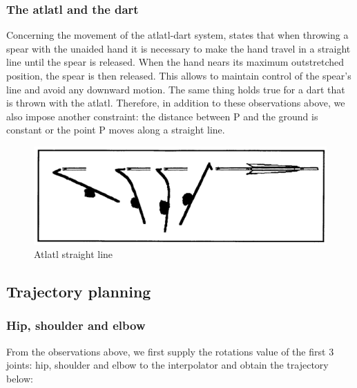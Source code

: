 \documentclass[a4paper, xcolor = usenames,dvipsnames]{article}
\begin{document}
\hypertarget{the-atlatl-and-the-dart}{%
\subsubsection{The atlatl and the dart}\label{the-atlatl-and-the-dart}}

Concerning the movement of the atlatl-dart system, \textcite{10.2307/279223} states that when throwing a spear with the unaided hand it is necessary to make the hand travel in a straight line until the spear is released. When the hand nears its maximum outstretched position, the spear is then released. This allows to maintain control of the spear's line and avoid any downward motion. The same thing holds true for a dart that is thrown with the atlatl. Therefore, in addition to these observations above, we also impose another constraint: the distance between P and the ground is constant or the point P moves along a straight line.

\begin{figure}

{\centering \includegraphics[width=0.75\linewidth]{res/observations/straight} 

}

\caption{Atlatl straight line}\label{fig:constant-P}
\end{figure}

\hypertarget{trajectory-planning-1}{%
\subsection{Trajectory planning}\label{trajectory-planning-1}}

\hypertarget{hip-shoulder-and-elbow}{%
\subsubsection{Hip, shoulder and elbow}\label{hip-shoulder-and-elbow}}

From the observations above, we first supply the rotations value of the first \(3\) joints: hip, shoulder and elbow to the interpolator and obtain the trajectory below:
\end{document}
